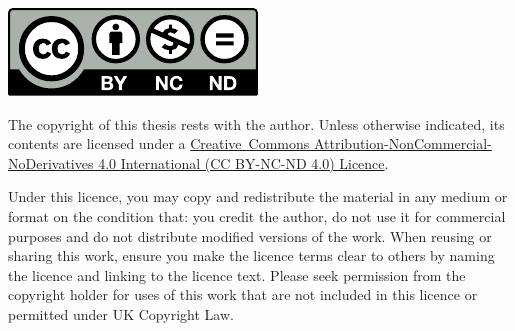 \noindent
\begin{minipage}[b]{0.3275\textwidth}
    \noindent \raggedright \includegraphics[width=\linewidth]{doclicense-CC-by-nc-nd.pdf}
\end{minipage}
\hfill
\hspace*{0.0225\textwidth}
\begin{minipage}[b]{0.65\textwidth}
    The    copyright    of    this     thesis    rests    with    the    author.
    Unless   otherwise    indicated,   its    contents   are    licensed   under
    a   \href{https://creativecommons.org/licenses/by-nc-nd/4.0/}{\mbox{Creative
    Commons}   Attribution-NonCommercial-NoDerivatives  4.0   International  (CC
    BY-NC-ND 4.0) Licence}.
\end{minipage}

\noindent Under this licence, you may  copy and redistribute the material in any
medium or format on the condition that: you credit the author, do not use it for
commercial purposes  and do not distribute  modified versions of the  work. When
reusing or sharing this work, ensure you  make the licence terms clear to others
by naming  the licence and linking  to the licence text.  Please seek permission
from the copyright  holder for uses of  this work that are not  included in this
licence or permitted under UK Copyright Law.

\vfill

